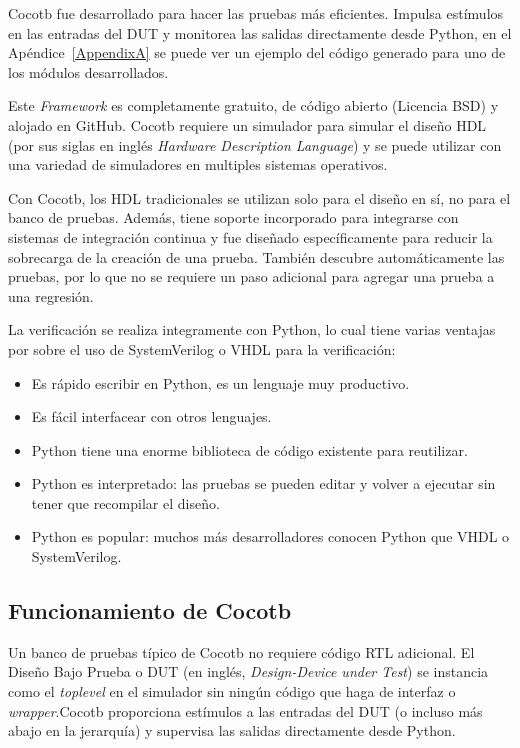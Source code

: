   Cocotb fue desarrollado para hacer las pruebas más eficientes. Impulsa
  estímulos en las entradas del DUT y monitorea las salidas directamente
  desde Python, en el Apéndice~\ref{AppendixA} se puede ver un ejemplo del
  código generado para uno de los módulos desarrollados.

  Este \textit{Framework} es completamente gratuito, de código abierto (Licencia
  BSD) y alojado en GitHub. Cocotb requiere un simulador para simular el
  diseño HDL (por sus siglas en inglés \textit{Hardware Description Language}) y
  se puede utilizar con una variedad de simuladores en multiples sistemas
  operativos.


  Con Cocotb, los HDL tradicionales se utilizan solo para el diseño en
  sí, no para el banco de pruebas. Además, tiene soporte incorporado para
  integrarse con sistemas de integración continua y fue diseñado específicamente
  para reducir la sobrecarga de la creación de una prueba. También descubre
  automáticamente las pruebas, por lo que no se requiere un paso adicional para
  agregar una prueba a una regresión.

  La verificación se realiza integramente con Python, lo cual tiene varias
  ventajas por sobre el uso de SystemVerilog o VHDL para la verificación:

\begin{itemize}
  \item Es rápido escribir en Python, es un lenguaje muy productivo.
  \item Es fácil interfacear con otros lenguajes.
  \item Python tiene una enorme biblioteca de código existente para reutilizar.
  \item Python es interpretado: las pruebas se pueden editar y volver a ejecutar
  sin tener que recompilar el diseño.
  \item Python es popular: muchos más desarrolladores conocen Python que
  VHDL o SystemVerilog.
\end{itemize}

\subsection{Funcionamiento de Cocotb}

  Un banco de pruebas típico de Cocotb no requiere código RTL adicional.
  El Diseño Bajo Prueba o DUT (en inglés, \textit{Design-Device
  under Test}) se instancia como el \textit{toplevel} en el simulador sin ningún
  código que haga de interfaz o \textit{wrapper}.Cocotb proporciona
  estímulos a las entradas del DUT (o incluso más abajo en la jerarquía) y
  supervisa las salidas directamente desde Python.




